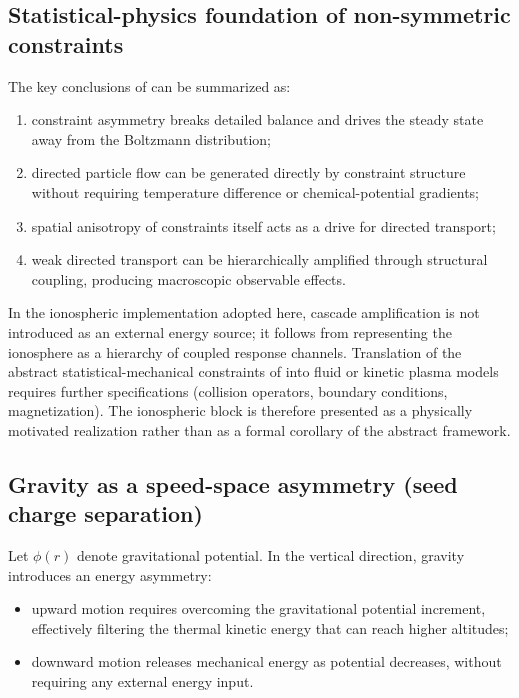 \documentclass[11pt,a4paper]{article}
\begin{document}
\subsection{Statistical-physics foundation of non-symmetric constraints}
The key conclusions of \cite{peng2026entropydirectionmirrorstateparadox} can be summarized as:
\begin{enumerate}
  \item constraint asymmetry breaks detailed balance and drives the steady state away from the Boltzmann distribution;
  \item directed particle flow can be generated directly by constraint structure without requiring temperature difference or chemical-potential gradients;
  \item spatial anisotropy of constraints itself acts as a drive for directed transport;
  \item weak directed transport can be hierarchically amplified through structural coupling, producing macroscopic observable effects.
\end{enumerate}
In the ionospheric implementation adopted here, cascade amplification is not introduced as an external energy source; it follows from representing the ionosphere as a hierarchy of coupled response channels. Translation of the abstract statistical-mechanical constraints of \cite{peng2026entropydirectionmirrorstateparadox} into fluid or kinetic plasma models requires further specifications (collision operators, boundary conditions, magnetization). The ionospheric block is therefore presented as a physically motivated realization rather than as a formal corollary of the abstract framework.

\subsection{Gravity as a speed-space asymmetry (seed charge separation)}
Let $\phi(r)$ denote gravitational potential. In the vertical direction, gravity introduces an energy asymmetry:
\begin{itemize}
  \item upward motion requires overcoming the gravitational potential increment, effectively filtering the thermal kinetic energy that can reach higher altitudes;
  \item downward motion releases mechanical energy as potential decreases, without requiring any external energy input.
\end{itemize}
\end{document}
